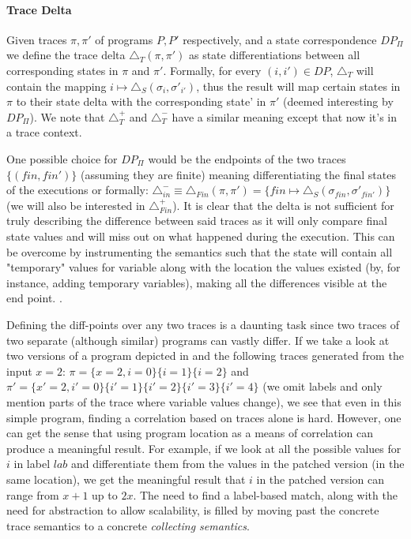 \paragraph{Trace Delta} 
 Given traces $\pi,\pi'$ of programs $P,P'$ respectively, and a state correspondence $DP_{\Pi}$ we define the trace delta $\triangle_{T}(\pi,\pi')$ as state differentiations between all corresponding states in $\pi$ and $\pi'$. Formally, for every $(i,i') \in DP$, $\triangle_{T}$ will contain the mapping $i\mapsto\triangle_{S}(\sigma_{i},\sigma'_{i'})$, thus the result will map certain states in $\pi$ to their state delta with the corresponding state' in $\pi'$ (deemed interesting by $DP_{\Pi}$). We note that $\triangle_{T}^{+}$ and $\triangle_{T}^{-}$ have a similar meaning except that now it's in a trace context.

One possible choice for $DP_{\Pi}$ would be the endpoints of the two traces $\{(fin,fin')\}$ (assuming they are finite) meaning differentiating the final states of the executions or formally: $\triangle_{in}^{-} \equiv \triangle_{Fin}(\pi,\pi') = \{fin\mapsto\triangle_{S}(\sigma_{fin},\sigma'_{fin'})\}$ (we will also be interested in $\triangle_{Fin}^{+}$). It is clear that the delta is not sufficient for truly describing the difference between said traces as it will only compare final state values and will miss out on what happened during the execution. This can be overcome by instrumenting the semantics such that the state will contain all "temporary" values for variable along with the location the values existed (by, for instance, adding temporary variables), making all the differences visible at the end point. .

Defining the diff-points over any two traces is a daunting task since two traces of two separate (although similar) programs can vastly differ. If we take a look at two versions of a program depicted in  and the following traces generated from the input $x=2$: $\pi = \{x=2,i=0 \}\{i=1 \}\{i=2 \}$ and $\pi' = \{ x'=2,i'=0 \}\{ i'=1 \}\{ i'=2 \}\{ i'=3 \}\{i'=4\}$ (we omit labels and only mention parts of the trace where variable values change), we see that even in this simple program, finding a correlation based on traces alone is hard. However, one can get the sense that using program location as a means of correlation can produce a meaningful result. For example, if we look at all the possible values for $i$ in label $lab$ and differentiate them from the values in the patched version (in the same location), we get the meaningful result that $i$ in the patched version can range from $x+1$ up to $2x$. The need to find a label-based match, along with the need for abstraction to allow scalability, is filled by moving past the concrete trace semantics to a concrete \emph{collecting semantics}.

